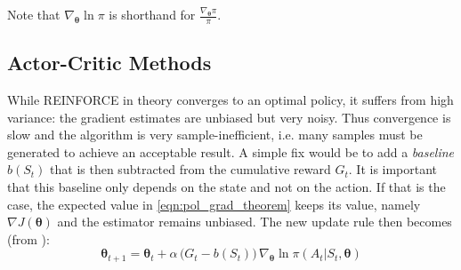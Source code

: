 Note that $\nabla_{\bm{\theta}} \ln \pi$ is shorthand for $\frac{\nabla_{\bm{\theta}} \pi}{ \pi}$.
\subsection{Actor-Critic Methods}
\label{sec:actor_critic}
While REINFORCE in theory converges to an optimal policy, it suffers from high variance: the gradient estimates are unbiased but very noisy. Thus convergence is slow and the algorithm is very sample-inefficient, i.e. many samples must be generated to achieve an acceptable result. A simple fix would be to add a \emph{baseline} $b(S_t)$ that is then subtracted from the cumulative reward $G_t$. It is important that this baseline only depends on the state and not on the action. If that is the case, the expected value in \ref{eqn:pol_grad_theorem} keeps its value, namely $\nabla J(\bm{\theta})$ and the estimator remains unbiased. The new update rule then becomes (from \cite{sutton2018reinforcement}):
\begin{equation}
    \label{eqn:pg_update}
    \bm{\theta}_{t+1} = \bm{\theta}_{t} + \alpha \,\big ( G_t - b(S_t) \big) \, \nabla_{\bm{\theta}} \ln \pi(A_t|S_t,\bm{\theta})
\end{equation}

